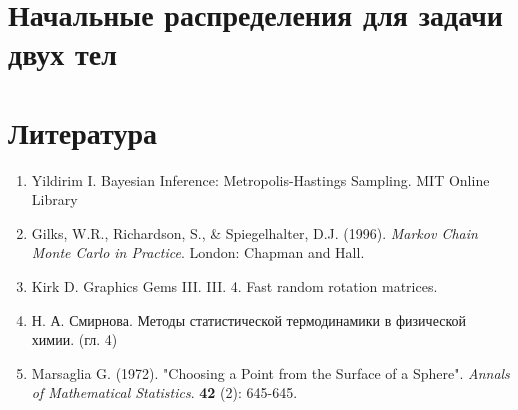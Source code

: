 \documentclass[12pt]{article}
\begin{document}
\tableofcontents
\newpage

\section{Начальные распределения для задачи двух тел}













\newpage
\section{Литература}
\begin{enumerate}
	\item Yildirim I. Bayesian Inference: Metropolis-Hastings Sampling. MIT Online Library
	\item Gilks, W.R., Richardson, S., \& Spiegelhalter, D.J. (1996). \textit{Markov Chain Monte Carlo in Practice}. London: Chapman and Hall.
	\item  Kirk D. Graphics Gems III. III. 4. Fast random rotation matrices. 
	\item Н. А. Смирнова. Методы статистической термодинамики в физической химии. (гл. 4)

	\item Marsaglia G. (1972). "Choosing a Point from the Surface of a Sphere". \textit{Annals of Mathematical Statistics}. \textbf{42} (2): 645-645.
\end{enumerate}

\newpage

\end{document}
